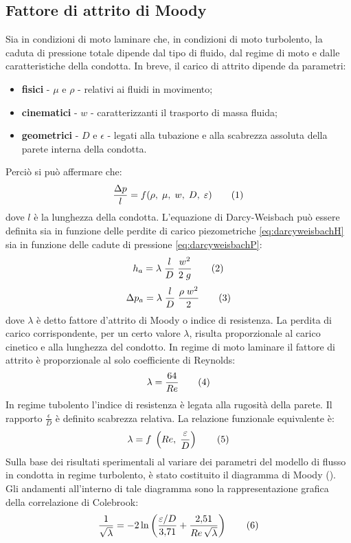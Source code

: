 \subsection{Fattore di attrito di Moody}
Sia in condizioni di moto laminare che, in condizioni di moto turbolento, la caduta di pressione totale dipende dal tipo di fluido, dal regime di moto e dalle caratteristiche della condotta. In breve, il carico di attrito dipende da parametri:
\begin{itemize}
    \item \textbf{fisici} - \(\mu\) e \(\rho\) - relativi ai fluidi in movimento;
    \item \textbf{cinematici} - \(w\) - caratterizzanti il trasporto di massa fluida;
    \item \textbf{geometrici} - \(D\) e \(\epsilon\) - legati alla tubazione e alla scabrezza assoluta della parete interna della condotta.
\end{itemize}
Perciò si può affermare che:
\[\frac{\Delta p}{l}=f(\rho, \; \mu, \; w, \; D, \; \epsilon) \addtag \label{eq:funzcaduta} \]
dove \(l\) è la lunghezza della condotta. L'equazione di Darcy-Weisbach può essere definita sia in funzione delle perdite di carico piezometriche \eqref{eq:darcyweisbachH} sia in funzione delle cadute di pressione \eqref{eq:darcyweisbachP}:
\[h_a = \lambda \; \frac{l}{D} \; \frac{w^2}{2 \; g} \addtag \label{eq:darcyweisbachH} \]
\[\Delta p_a = \lambda \; \frac{l}{D} \; \frac{\rho \; w^2}{2} \addtag \label{eq:darcyweisbachP} \]
dove \(\lambda\) è detto fattore d'attrito di Moody o indice di resistenza. La perdita di carico corrispondente, per un certo valore \(\lambda\), risulta proporzionale al carico cinetico e alla lunghezza del condotto. In regime di moto laminare il fattore di attrito è proporzionale al solo coefficiente di Reynolds:
\[\lambda=\frac{64}{Re} \addtag \]
In regime tubolento l'indice di resistenza è legata alla rugosità della parete. Il rapporto \(\frac{\epsilon}{D}\) è definito scabrezza relativa. La relazione funzionale equivalente è:
\[\lambda=f \; \left(Re, \; \frac{\epsilon}{D}\right) \addtag \]
Sulla base dei risultati sperimentali al variare dei parametri del modello di flusso in condotta in regime turbolento, è stato costituito il diagramma di Moody (). Gli andamenti all'interno di tale diagramma sono la rappresentazione grafica della correlazione di Colebrook:
\[ \frac{1}{\sqrt{\lambda}} = - 2 \ln \left( \frac { \epsilon/D} {3{,}71} + \frac {2{,}51} {Re \, \sqrt{\lambda}} \right) \addtag \label{eq:colebrook} \]

